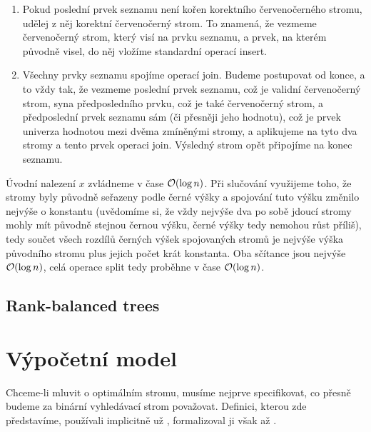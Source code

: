 \begin{enumerate}
\item Pokud poslední prvek seznamu není kořen korektního červenočerného stromu, udělej z něj korektní červenočerný strom. To znamená, že vezmeme červenočerný strom, který visí na prvku seznamu, a prvek, na kterém původně visel, do něj vložíme standardní operací insert.

\item Všechny prvky seznamu spojíme operací join. Budeme postupovat od konce, a to vždy tak, že vezmeme poslední prvek seznamu, což je validní červenočerný strom, syna předposledního prvku, což je také červenočerný strom, a předposlední prvek seznamu sám (či přesněji jeho hodnotu), což je prvek univerza hodnotou mezi dvěma zmíněnými stromy, a aplikujeme na tyto dva stromy a tento prvek operaci join. Výsledný strom opět připojíme na konec seznamu. 

\end{enumerate}

Úvodní nalezení $x$ zvládneme v čase $\mathcal O(\log n)$. Při slučování využijeme toho, že stromy byly původně seřazeny podle černé výšky a spojování tuto výšku změnilo nejvýše o konstantu (uvědomíme si, že vždy nejvýše dva po sobě jdoucí stromy mohly mít původně stejnou černou výšku, černé výšky tedy nemohou růst příliš), tedy součet všech rozdílů černých výšek spojovaných stromů je nejvýše výška původního stromu plus jejich počet krát konstanta. Oba sčítance jsou nejvýše $\mathcal O(\log n)$, celá operace split tedy proběhne v čase $\mathcal O(\log n)$.

\subsection{Rank-balanced trees}


\section{Výpočetní model}
Chceme-li mluvit o optimálním stromu, musíme nejprve specifikovat, co přesně
budeme za binární vyhledávací strom považovat. Definici, kterou zde
představíme, používali implicitně už \citet{splay}, formalizoval ji však až
\citet{tango}.


